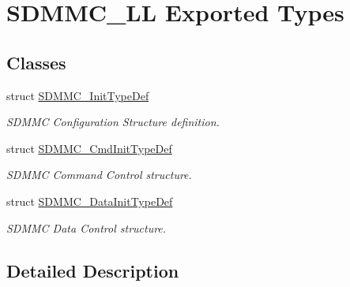 \hypertarget{group___s_d_m_m_c___l_l___exported___types}{}\section{S\+D\+M\+M\+C\+\_\+\+LL Exported Types}
\label{group___s_d_m_m_c___l_l___exported___types}
\subsection*{Classes}
\begin{DoxyCompactItemize}
\item 
struct \mbox{\hyperlink{struct_s_d_m_m_c___init_type_def}{S\+D\+M\+M\+C\+\_\+\+Init\+Type\+Def}}
\begin{DoxyCompactList}\small\item\em S\+D\+M\+MC Configuration Structure definition. \end{DoxyCompactList}\item 
struct \mbox{\hyperlink{struct_s_d_m_m_c___cmd_init_type_def}{S\+D\+M\+M\+C\+\_\+\+Cmd\+Init\+Type\+Def}}
\begin{DoxyCompactList}\small\item\em S\+D\+M\+MC Command Control structure. \end{DoxyCompactList}\item 
struct \mbox{\hyperlink{struct_s_d_m_m_c___data_init_type_def}{S\+D\+M\+M\+C\+\_\+\+Data\+Init\+Type\+Def}}
\begin{DoxyCompactList}\small\item\em S\+D\+M\+MC Data Control structure. \end{DoxyCompactList}\end{DoxyCompactItemize}


\subsection{Detailed Description}
